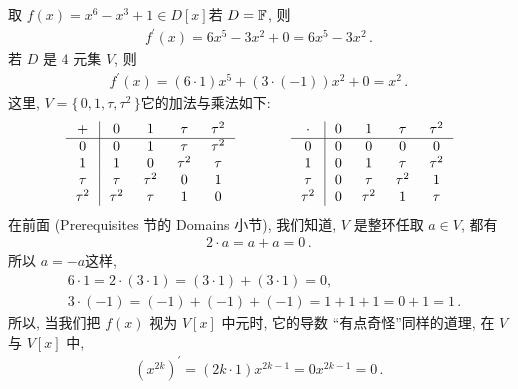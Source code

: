 \begin{example}
    取 $f(x) = x^6 - x^3 + 1 \in D[x]$\period 若 $D = \mathbb{F}$, 则
    \begin{align*}
        f^{\prime}(x) = 6x^5 - 3x^2 + 0 = 6x^5 - 3x^2 \period
    \end{align*}
    若 $D$ 是 $4$ 元集 $V$, 则
    \begin{align*}
        f^{\prime}(x) = (6 \cdot 1)x^5 + (3 \cdot (-1)) x^2 + 0 = x^2 \period
    \end{align*}
    这里, $V = \{\, 0,1,\tau,\tau^2 \,\}$\period 它的加法与乘法如下:
    \begin{align*}
        \arraycolsep=0.25cm
        \begin{array}{c|cccc}
            +      & 0      & 1      & \tau   & \tau^2 \\ \hline
            0      & 0      & 1      & \tau   & \tau^2 \\
            1      & 1      & 0      & \tau^2 & \tau   \\
            \tau   & \tau   & \tau^2 & 0      & 1      \\
            \tau^2 & \tau^2 & \tau   & 1      & 0      \\
        \end{array}
        \qquad \qquad
        \begin{array}{c|cccc}
            \cdot  & 0 & 1      & \tau   & \tau^2 \\ \hline
            0      & 0 & 0      & 0      & 0      \\
            1      & 0 & 1      & \tau   & \tau^2 \\
            \tau   & 0 & \tau   & \tau^2 & 1      \\
            \tau^2 & 0 & \tau^2 & 1      & \tau   \\
        \end{array}
    \end{align*}
    在前面 (Prerequisites 节的 Domains 小节), 我们知道, $V$ 是整环\period 任取 $a \in V$, 都有
    \begin{align*}
        2 \cdot a = a + a = 0 \period
    \end{align*}
    所以 $a = -a$\period 这样,
    \begin{align*}
         & 6 \cdot 1 = 2 \cdot (3 \cdot 1) = (3 \cdot 1) + (3 \cdot 1) = 0,  \\
         & 3 \cdot (-1) = (-1) + (-1) + (-1) = 1 + 1 + 1 = 0 + 1 = 1 \period
    \end{align*}
    所以, 当我们把 $f(x)$ 视为 $V[x]$ 中元时, 它的导数 ``有点奇怪''\period 同样的道理, 在 $V$ 与 $V[x]$ 中,
    \begin{align*}
        (x^{2k})^{\prime} = (2k \cdot 1) x^{2k-1} = 0 x^{2k-1} = 0 \period
    \end{align*}
\end{example}

